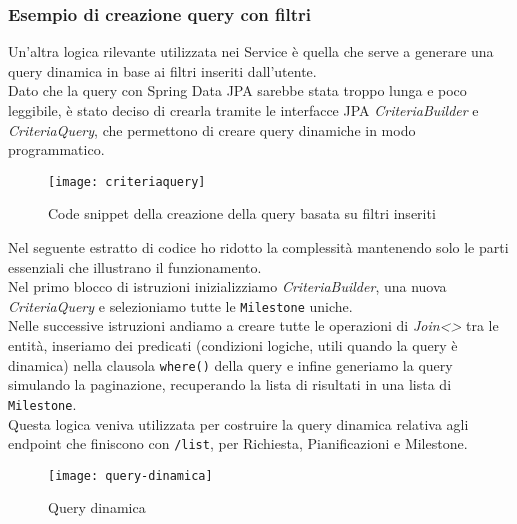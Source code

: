 \subsubsection{Esempio di creazione query con filtri}
Un'altra logica rilevante utilizzata nei Service è quella che serve a generare una query dinamica in base ai filtri inseriti dall'utente.\\
Dato che la query con Spring Data JPA sarebbe stata troppo lunga e poco leggibile, è stato deciso di crearla tramite le interfacce JPA \textit{CriteriaBuilder} e \textit{CriteriaQuery}, che permettono di creare query dinamiche in modo programmatico.
\begin{figure}[H] 
    \centering 
    \texttt{[image: criteriaquery]} 
    \caption{Code snippet della creazione della query basata su filtri inseriti}
\end{figure}
\noindent Nel seguente estratto di codice ho ridotto la complessità mantenendo solo le parti essenziali che illustrano il funzionamento.\\
Nel primo blocco di istruzioni inizializziamo \textit{CriteriaBuilder}, una nuova \textit{CriteriaQuery} e selezioniamo tutte le \texttt{Milestone} uniche.\\
Nelle successive istruzioni andiamo a creare tutte le operazioni di \textit{Join<>} tra le entità, inseriamo dei predicati (condizioni logiche, utili quando la query è dinamica) nella clausola \texttt{where()} della query e infine generiamo la query simulando la paginazione, recuperando la lista di risultati in una lista di \texttt{Milestone}.\\
Questa logica veniva utilizzata per costruire la query dinamica relativa agli endpoint che finiscono con \texttt{/list}, per Richiesta, Pianificazioni e Milestone.
\begin{figure}[H] 
    \centering 
    \texttt{[image: query-dinamica]} 
    \caption{Query dinamica}
\end{figure}

